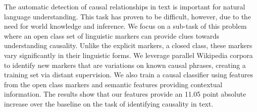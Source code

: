 The automatic detection of causal relationships in text is important for natural language understanding. This task has proven to be difficult, however, due to the need for world knowledge and inference. We focus on a sub-task of this problem where an open class set of linguistic markers can provide clues towards understanding causality. Unlike the explicit markers, a closed class, these markers vary significantly in their linguistic forms. We leverage parallel Wikipedia corpora to identify new markers that are variations on known causal phrases, creating a training set via distant supervision. We also train a causal classifier using features from the open class markers and semantic features providing contextual information. The results show that our features provide an 11.05 point absolute increase over the baseline on the task of identifying causality in text.
